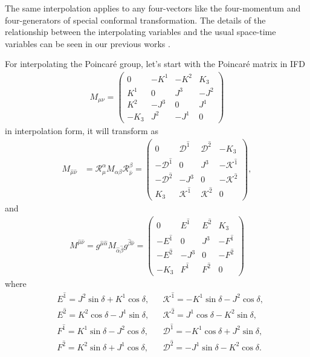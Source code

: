 \documentclass[journal,article,submit,pdftex,moreauthors]{Definitions/mdpi}
\newcommand{\muT}{\hat{\mu}}
\newcommand{\nuT}{\hat{\nu}}
\newcommand{\itP}[1]{\hat{#1}}
\begin{document}
The same interpolation
applies to any four-vectors like the four-momentum and four-generators of special conformal transformation. The details of the relationship between the
interpolating variables and the usual space-time variables
can be seen in our previous works  \cite{Ji2001, Hornbostel1992, Ji1996, Ji2012, Ji2015EM, Ji2015SP, Ji2018QED, Ji2021QCD}.

For interpolating the Poincar\'e group, let's start with the Poincar\'e matrix in IFD
\begin{align}\label{eqn:J_mu_nu_IF}
  M_{\mu\nu}=\begin{pmatrix}
     0&-K^1&-K^2&K_3\\
     K^1&0&J^3&-J^2\\
     K^2&-J^3&0&J^1\\
     -K_3&J^2&-J^1&0
     \end{pmatrix}
\end{align}
in interpolation form, it will transform as
\begin{align}\label{eqn:Poincare_Matrix_Interpolation_superscripts}
  M_{\muT\nuT}
  &=\mathcal{R}_{\hat{\mu}}^{{\alpha}}M_{\alpha\beta}\mathcal{R}_{\hat{\nu}}^{{\beta}}=\begin{pmatrix}
    0 & {\mathcal{D}}^{\itP{1}} & {\mathcal{D}}^{\itP{2}} & -K_3\\
    -{\mathcal{D}}^{\itP{1}} & 0 & {J}^{3} & -{\mathcal{K}}^{\itP{1}}\\
    -{\mathcal{D}}^{\itP{2}} & -{J}^{3} & 0 & -{\mathcal{K}}^{\itP{2}}\\
    K_3 & {\mathcal{K}}^{\itP{1}} & {\mathcal{K}}^{\itP{2}} & 0
  \end{pmatrix},
\end{align}
and
\begin{align}
  M^{\muT\nuT}
  =
  g^{\muT\itP{\alpha}}M_{\itP{\alpha}\itP{\beta}}g^{\itP{\beta}\nuT}
  =
  \begin{pmatrix}
    0 & {E}^{\itP{1}} & {E}^{\itP{2}} & K_3\\
    -{E}^{\itP{1}} & 0 & {J}^{3} & -{F}^{\itP{1}}\\
    -{E}^{\itP{2}} & -{J}^{3} & 0 & -{F}^{\itP{2}}\\
    -K_3 & {F}^{\itP{1}} & {F}^{\itP{2}} & 0
  \end{pmatrix}
\end{align}
where
\begin{align}\label{eqn:E_F_D_K_Definition_Interpolation_Angle}
  &E^{\itP{1}}=J^{2}\sin\delta+K^{1}\cos\delta,
  &&\mathcal{K}^{\itP{1}}=-K^{1}\sin\delta-J^{2}\cos\delta, \nonumber\\
  &E^{\itP{2}}=K^{2}\cos\delta-J^{1}\sin\delta,
  &&\mathcal{K}^{\itP{2}}=J^{1}\cos\delta-K^{2}\sin\delta, \nonumber\\
  &F^{\itP{1}}=K^{1}\sin\delta-J^{2}\cos\delta,
  &&\mathcal{D}^{\itP{1}}=-K^{1}\cos\delta+J^{2}\sin\delta, \nonumber\\
  &F^{\itP{2}}=K^{2}\sin\delta+J^{1}\cos\delta,
  &&\mathcal{D}^{\itP{2}}=-J^{1}\sin\delta-K^{2}\cos\delta.
\end{align}
\end{document}
